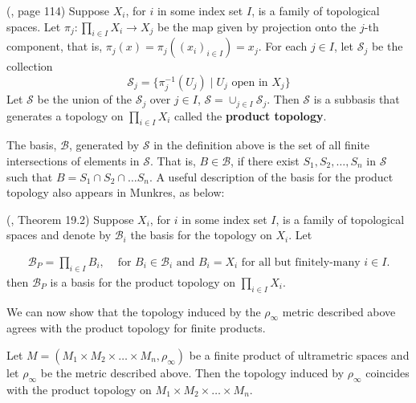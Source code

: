 \begin{definition-proposition} 
	(\cite{mun}, page 114) Suppose $X_i$, for $i$ in some index set $I$, is a family of topological spaces.  Let $\pi_j: \prod_{i \in I} X_i \rightarrow X_j$ be the map given by projection onto the $j$-th component, that is, $\pi_j (x) = \pi_j ((x_i)_{i \in I}) = x_j$. For each $j \in I$, let $\mathcal{S}_j$ be the collection \[\mathcal{S}_j = \{\pi^{-1}_j (U_j)\mid U_j \text{ open in } X_j\}\] Let $\mathcal{S}$ be the union of the $\mathcal{S}_j$ over $j \in I$, $\mathcal{S}= \cup_{j \in I} \mathcal{S}_j$. Then $\mathcal{S}$ is a subbasis that generates a topology on  $\prod_{i \in I} X_i$ called the \textbf{product topology}.\\
\end{definition-proposition}


The basis, $\mathcal{B}$, generated by $\mathcal{S}$ in the definition above is the set of all finite intersections of elements in $\mathcal{S}$. That is, $B \in \mathcal{B}$, if there exist $S_1, S_2, \ldots, S_n$ in $\mathcal{S}$ such that $B = S_1 \cap S_2 \cap \ldots S_n$.  A useful description of the basis for the product topology also appears in Munkres, as below:\\

\begin{proposition} 
	(\cite{mun}, Theorem 19.2) Suppose $X_i$, for $i$ in some index set $I$, is a family of topological spaces and denote by $\mathcal{B}_i$ the basis for the topology on $X_i$. Let 
	
	\begin{align*}
	\mathcal{B}_P = \prod_{i \in I} B_i, & \text{ for }  B_i \in \mathcal{B}_i \text { and } B_i = X_i \text{ for all but finitely-many } i \in I. 
	\end{align*}
	then $\mathcal{B}_P$ is a basis for the product topology on $\prod_{i \in I} X_i$.\\
	
\end{proposition}

We can now show that the topology induced by the $\rho_\infty$ metric described above agrees with the product topology for finite products.\\

\begin{proposition}
	Let $M=(M_{1} \times M_{2} \times \ldots \times M_{n},\rho_\infty)$ be a finite product of ultrametric spaces and let $\rho_\infty$ be the metric described above.  Then the topology induced by $\rho_\infty$ coincides with the product topology on $M_{1} \times M_{2} \times \ldots \times M_{n}$.
\end{proposition}

